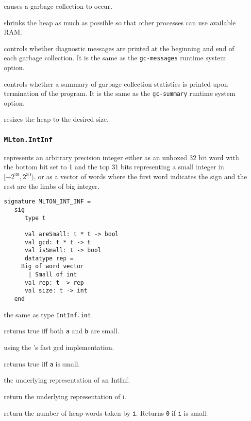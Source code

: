 \begin{description}
causes a garbage collection to occur.

shrinks the heap as much as possible so that other processes can use available
RAM.

controls whether diagnostic messages are
printed at the beginning and end of each garbage collection.  It is
the same as the {\tt gc-messages} runtime system option.

controls whether a summary of garbage
collection statistics is printed upon termination of the program.  It
is the same as the {\tt gc-summary} runtime system option.

resizes the heap to the desired size.

\end{description}
%
\subsubsection{{\tt MLton.IntInf}}

{\mlton} represents an arbitrary precision integer either as an
unboxed 32 bit word with the bottom bit set to 1 and the top 31 bits
representing a small integer in $[-2^{30}, 2^{30})$, or as a vector of
words where the first word indicates the sign and the rest are the
limbs of {\gmp} big integer.
\begin{verbatim}
signature MLTON_INT_INF =
   sig
      type t

      val areSmall: t * t -> bool
      val gcd: t * t -> t
      val isSmall: t -> bool
      datatype rep =
	 Big of word vector
       | Small of int
      val rep: t -> rep
      val size: t -> int
   end
\end{verbatim}

\begin{description}

the same as type {\tt IntInf.int}.

returns true iff both {\tt a} and {\tt b} are small.

using the {\gmp}'s fast gcd implementation.

returns true iff {\tt a} is small.

the underlying representation of an IntInf.

return the underlying representation of i.

return the number of heap words taken by {\tt i}.  Returns {\tt 0} if
{\tt i} is small.

\end{description}

